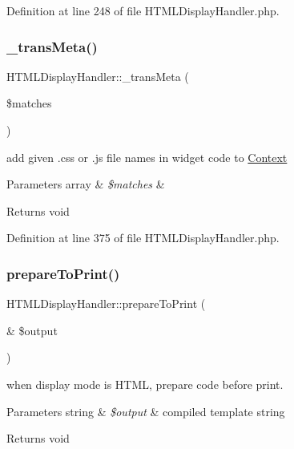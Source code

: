 Definition at line 248 of file H\+T\+M\+L\+Display\+Handler.\+php.

\mbox{\label{classHTMLDisplayHandler_aa80671d70e293852abad65f4c79f5631}} 
\subsubsection{\texorpdfstring{\+\_\+trans\+Meta()}{\_transMeta()}}
{\footnotesize\ttfamily H\+T\+M\+L\+Display\+Handler\+::\+\_\+trans\+Meta (\begin{DoxyParamCaption}\item[{}]{\$matches }\end{DoxyParamCaption})}

add given .css or .js file names in widget code to \hyperlink{classContext}{Context} 
\begin{DoxyParams}[1]{Parameters}
array & {\em \$matches} & \\
\hline
\end{DoxyParams}
\begin{DoxyReturn}{Returns}
void 
\end{DoxyReturn}


Definition at line 375 of file H\+T\+M\+L\+Display\+Handler.\+php.

\mbox{\label{classHTMLDisplayHandler_a92daeef7b0da4840345986d1966ecf0c}} 
\subsubsection{\texorpdfstring{prepare\+To\+Print()}{prepareToPrint()}}
{\footnotesize\ttfamily H\+T\+M\+L\+Display\+Handler\+::prepare\+To\+Print (\begin{DoxyParamCaption}\item[{\&}]{\$output }\end{DoxyParamCaption})}

when display mode is H\+T\+ML, prepare code before print. 
\begin{DoxyParams}[1]{Parameters}
string & {\em \$output} & compiled template string \\
\hline
\end{DoxyParams}
\begin{DoxyReturn}{Returns}
void 
\end{DoxyReturn}


